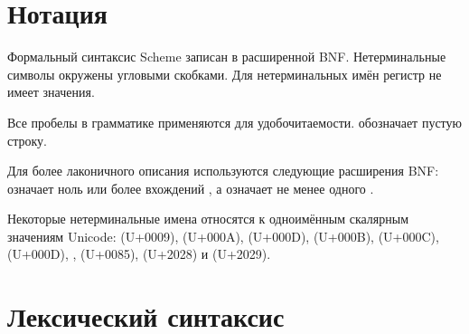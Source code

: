 \section{Нотация}
\label{BNF}

Формальный синтаксис Scheme записан в расширенной BNF. Нетерминальные символы окружены
угловыми скобками. Для нетерминальных имён регистр не имеет значения.

Все пробелы в грамматике применяются для удобочитаемости.  обозначает пустую строку.

Для более лаконичного описания используются следующие расширения BNF:  означает
ноль или более вхождений , а  означает не менее
одного .

Некоторые нетерминальные имена относятся к одноимённым скалярным значениям Unicode:
 (U+0009),  (U+000A),  (U+000D),
 (U+000B),  (U+000C),  (U+000D),
,  (U+0085),  (U+2028) и
 (U+2029).

\section{Лексический синтаксис}
\label{lexicalsyntaxsection}


